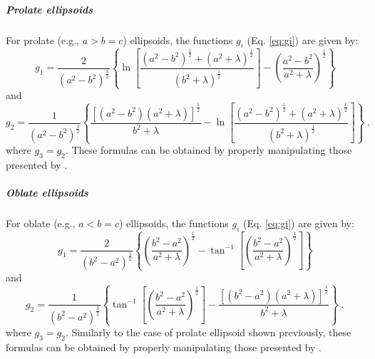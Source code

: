 \documentclass[gmd, manuscript]{copernicus}
\begin{document}
\subparagraph*{Prolate ellipsoids}


For prolate (e.g., $a > b = c$) ellipsoids, the functions
$g_{i}$ (Eq. \ref{eq:gi}) are given by:
\begin{equation}
g_{1} =  \frac{2}{\left( a^{2} - b^{2} \right)^{\frac{3}{2}}}
\left\lbrace
\ln \left[ \frac{\left( a^{2} - b^{2} \right)^{\frac{1}{2}} +
                 \left( a^{2} + \lambda \right)^{\frac{1}{2}}}{
                 \left( b^{2} + \lambda \right)^{\frac{1}{2}}} \right] -
\left( \frac{a^{2} - b^{2}}{a^{2} + \lambda} \right)^{\frac{1}{2}}
\right\rbrace
\label{eq:g1-prolate}
\end{equation}
and
\begin{equation}
g_{2} =  \frac{1}{\left( a^{2} - b^{2} \right)^{\frac{3}{2}}}
\left\lbrace
\frac{\left[ \left( a^{2} - b^{2} \right)
             \left( a^{2} + \lambda \right) \right]^{\frac{1}{2}}}{b^{2} + \lambda} -
\ln \left[ \frac{\left( a^{2} - b^{2} \right)^{\frac{1}{2}} +
                 \left( a^{2} + \lambda \right)^{\frac{1}{2}}}{
                 \left( b^{2} + \lambda \right)^{\frac{1}{2}}} \right]
\right\rbrace \: ,
\label{eq:g2-prolate}
\end{equation}
where $g_{3} = g_{2}$.
These formulas can be obtained by properly manipulating those
presented by \citep{emerson1985}.


\subparagraph*{Oblate ellipsoids}


For oblate (e.g., $a < b = c$) ellipsoids, the functions
$g_{i}$ (Eq. \ref{eq:gi}) are given by:
\begin{equation}
g_{1} =  \frac{2}{\left( b^{2} - a^{2} \right)^{\frac{3}{2}}}
\left\lbrace
\left( \frac{b^{2} - a^{2}}{a^{2} + \lambda}\right)^{\frac{1}{2}} -
\tan^{-1} \left[ \left( \frac{b^{2} - a^{2}}{a^{2} + \lambda}\right)^{\frac{1}{2}} \right]
\right\rbrace
\label{eq:g1-oblate}
\end{equation}
and
\begin{equation}
g_{2} =  \frac{1}{\left( b^{2} - a^{2} \right)^{\frac{3}{2}}}
\left\lbrace
\tan^{-1} \left[ \left( \frac{b^{2} - a^{2}}{a^{2} + \lambda}\right)^{\frac{1}{2}} \right] -
\frac{\left[ \left( b^{2} - a^{2} \right)
             \left( a^{2} + \lambda \right) \right]^{\frac{1}{2}}}{b^{2} + \lambda}
\right\rbrace \: ,
\label{eq:g2-oblate}
\end{equation}
where $g_{3} = g_{2}$.
Similarly to the case of prolate ellipsoid shown previously,
these formulas can be obtained by properly manipulating those
presented by \citep{emerson1985}.
\end{document}
